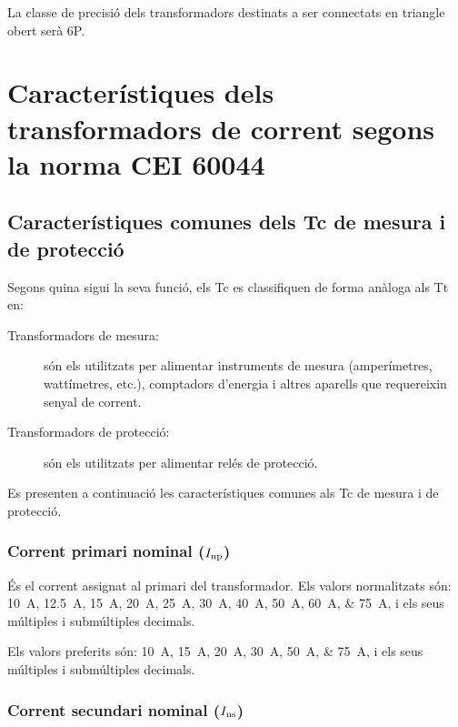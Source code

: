 La classe de precisió dels transformadors destinats a ser connectats en triangle obert serà 6P.

\section{Característiques dels transformadors de corrent segons la norma  CEI 60044}

\subsection{Característiques comunes dels Tc de mesura i de protecció}

Segons quina sigui la seva funció, els Tc es classifiquen de forma
anàloga als Tt en:
\begin{description}
   \item [\hspace{5mm}Transformadors de mesura:] són els utilitzats per alimentar
            instruments de mesura (amperímetres, wattímetres, etc.),
            comptadors d'energia i altres aparells que requereixin senyal de corrent.
   \item [\hspace{5mm}Transformadors de protecció:] són els utilitzats per
   alimentar relés de protecció.
\end{description}

Es presenten a continuació les característiques comunes als Tc de
mesura i de protecció.


\subsubsection{Corrent primari nominal ($I_\mathrm{np}$)}

 És el corrent assignat al
primari del transformador. Els valors normalitzats
són: \SIlist{10; 12,5; 15; 20; 25;30; 40; 50; 60;75}{A}, i els
seus múltiples i submúltiples decimals.

Els valors preferits són: \SIlist{10; 15; 20; 30; 50;75}{A}, i els
seus múltiples i submúltiples decimals.


\subsubsection{Corrent secundari nominal ($I_\mathrm{ns}$)}


